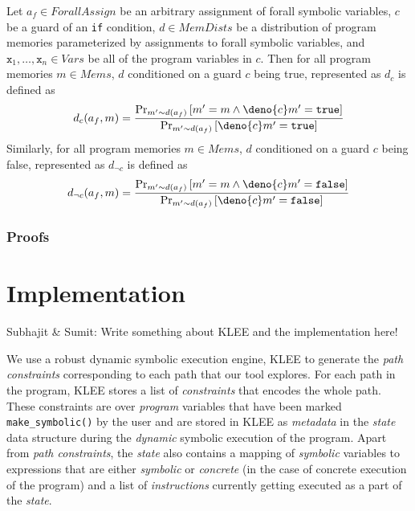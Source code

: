\documentclass[acmsmall,review]{acmart}\settopmatter{}
\begin{document}
	\begin{definition}
		\label{def:cond}
		Let $a_f \in ForallAssign$ be an arbitrary assignment of forall symbolic variables, $c$ be a guard of an \texttt{if} condition, $d \in MemDists$ be a distribution of program memories parameterized by assignments to forall symbolic variables, and $\mathtt{x}_1,\ldots,\mathtt{x}_n \in Vars$ be all of the program variables in $c$. Then for all program memories $m \in Mems$, $d$ conditioned on a guard $c$ being true, represented as $d_c$ is defined as
		\[
		d_c(a_f,m) = \frac{\Pr_{m' \sim d(a_f)}\left[ m' = m \land \deno{c}m' = \mathtt{true} \right]}{\Pr_{m' \sim d(a_f)}\left[ \deno{c}m' = \mathtt{true} \right]}
		\]
		Similarly, for all program memories $m \in Mems$, $d$ conditioned on a guard $c$ being false, represented as $d_{\neg c}$ is defined as
		\[
		d_{\neg c}(a_f,m) = \frac{\Pr_{m' \sim d(a_f)}\left[ m' = m \land \deno{c}m' = \mathtt{false} \right]}{\Pr_{m' \sim d(a_f)}\left[ \deno{c}m' = \mathtt{false} \right]}
		\]
	\end{definition}
	
	\subsubsection{Proofs}
	\label{sec:proofs}
	
	\section{Implementation}
	\label{sec:implementation}
	
	{\color{red} Subhajit \& Sumit: Write something about KLEE and the implementation here!}
	
	We use a robust dynamic symbolic execution engine, \textsc{KLEE} to generate the \textit{path constraints} corresponding to each path that our tool explores. For each path in the program, \textsc{KLEE} stores a list of \textit{constraints} that encodes the whole path. These constraints are over \textit{program} variables that have been marked \texttt{make\_symbolic()} by the user and are stored in \textsc{KLEE} as \textit{metadata} in the \textit{state} data structure during the \textit{dynamic} symbolic execution of the program. Apart from \textit{path constraints}, the \textit{state} also contains a mapping of \textit{symbolic} variables to expressions that are either  \textit{symbolic} or \textit{concrete} (in the case of concrete execution of the program) and a list of \textit{instructions} currently getting executed as a part of the \textit{state}.	
	
\end{document}
